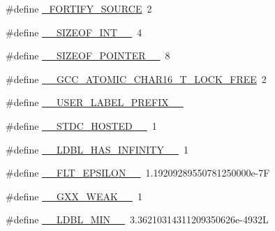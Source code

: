 \begin{DoxyCompactItemize}
\item 
\#define \hyperlink{build-analizer__host-_desktop___qt__5__9__0___g_c_c__64bit-debug_2moc__predefs_8h_ac95d263a48eda25c373846eb54144fc4}{\+\_\+\+F\+O\+R\+T\+I\+F\+Y\+\_\+\+S\+O\+U\+R\+C\+E}~2
\item 
\#define \hyperlink{build-analizer__host-_desktop___qt__5__9__0___g_c_c__64bit-debug_2moc__predefs_8h_a4b2be09502f3fe1cd13838c6761803b3}{\+\_\+\+\_\+\+S\+I\+Z\+E\+O\+F\+\_\+\+I\+N\+T\+\_\+\+\_\+}~4
\item 
\#define \hyperlink{build-analizer__host-_desktop___qt__5__9__0___g_c_c__64bit-debug_2moc__predefs_8h_a8bd657ce95940b7c6087cf5aa54d5280}{\+\_\+\+\_\+\+S\+I\+Z\+E\+O\+F\+\_\+\+P\+O\+I\+N\+T\+E\+R\+\_\+\+\_\+}~8
\item 
\#define \hyperlink{build-analizer__host-_desktop___qt__5__9__0___g_c_c__64bit-debug_2moc__predefs_8h_a7f18358ae5a65523140cb561bbeaa3a9}{\+\_\+\+\_\+\+G\+C\+C\+\_\+\+A\+T\+O\+M\+I\+C\+\_\+\+C\+H\+A\+R16\+\_\+\+T\+\_\+\+L\+O\+C\+K\+\_\+\+F\+R\+E\+E}~2
\item 
\#define \hyperlink{build-analizer__host-_desktop___qt__5__9__0___g_c_c__64bit-debug_2moc__predefs_8h_aff6bf0ff0fa3b5cbd23a8ae1131c87a9}{\+\_\+\+\_\+\+U\+S\+E\+R\+\_\+\+L\+A\+B\+E\+L\+\_\+\+P\+R\+E\+F\+I\+X\+\_\+\+\_\+}
\item 
\#define \hyperlink{build-analizer__host-_desktop___qt__5__9__0___g_c_c__64bit-debug_2moc__predefs_8h_a309fa84aefd09132258bbe21c20ef7d4}{\+\_\+\+\_\+\+S\+T\+D\+C\+\_\+\+H\+O\+S\+T\+E\+D\+\_\+\+\_\+}~1
\item 
\#define \hyperlink{build-analizer__host-_desktop___qt__5__9__0___g_c_c__64bit-debug_2moc__predefs_8h_a87140cc80075e8907e7bbfd910c5642a}{\+\_\+\+\_\+\+L\+D\+B\+L\+\_\+\+H\+A\+S\+\_\+\+I\+N\+F\+I\+N\+I\+T\+Y\+\_\+\+\_\+}~1
\item 
\#define \hyperlink{build-analizer__host-_desktop___qt__5__9__0___g_c_c__64bit-debug_2moc__predefs_8h_a7ac5a3b1dc00b508a391f8c6c37e2165}{\+\_\+\+\_\+\+F\+L\+T\+\_\+\+E\+P\+S\+I\+L\+O\+N\+\_\+\+\_\+}~1.\+19209289550781250000e-\/7\+F
\item 
\#define \hyperlink{build-analizer__host-_desktop___qt__5__9__0___g_c_c__64bit-debug_2moc__predefs_8h_afb5a2a4891df4551832357e97c6c3c59}{\+\_\+\+\_\+\+G\+X\+X\+\_\+\+W\+E\+A\+K\+\_\+\+\_\+}~1
\item 
\#define \hyperlink{build-analizer__host-_desktop___qt__5__9__0___g_c_c__64bit-debug_2moc__predefs_8h_ab572f59c4b0c5a1f4c2953f38a76d7b3}{\+\_\+\+\_\+\+L\+D\+B\+L\+\_\+\+M\+I\+N\+\_\+\+\_\+}~3.\+36210314311209350626e-\/4932\+L

\end{DoxyCompactItemize}
